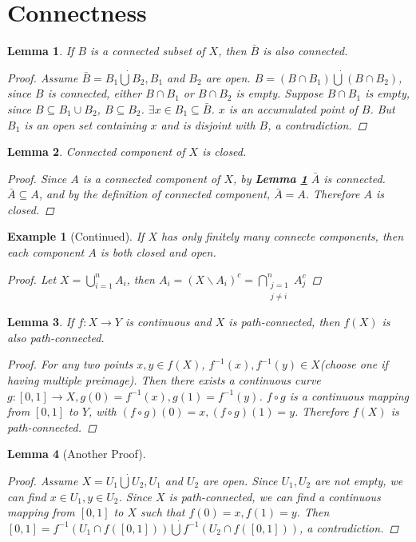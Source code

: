 \documentclass{article}
\newtheorem{example}{Example}[section] %
\newtheorem{lemma}{Lemma}[section]
\begin{document}
\section{Connectness}
\setcounter{lemma}{18}
\begin{lemma}\label{closedC}
If $B$ is a connected subset of $X$, then $\bar{B}$ is also connected.
\begin{proof}
Assume $\bar{B} = B_1 \dot\bigcup B_2,B_1$ and $B_2$ are open. $B = (B\cap B_1)\dot\bigcup (B\cap B_2)$, since $B$ is connected, either $B\cap B_1$ or
$B\cap B_2$ is empty. Suppose $B\cap B_1$ is empty, since $B\subseteq B_1\cup B_2$, $B\subseteq B_2$. $\exists x\in B_1\subseteq \bar{B}$. $x$ is an       
accumulated point of $B$. But $B_1$ is an open set containing $x$ and is disjoint with $B$, a contradiction.

\end{proof}
\end{lemma}
\setcounter{lemma}{21}
\begin{lemma}
Connected component of $X$ is closed.
\begin{proof}
Since $A$ is a connected component of $X$, by \textbf{Lemma \ref{closedC}} $\bar{A}$ is connected. $\bar{A}\subseteq A$, and by the definition of connected component, $\bar{A}=A$. Therefore $A$ is closed.
\end{proof}
\end{lemma}
\setcounter{example}{22}
\begin{example}[Continued]
If $X$ has only finitely many connecte components, then each component $A$ is both closed and open.
\begin{proof}
Let $X=\displaystyle\bigcup_{i=1}^n A_i$, then $A_i=(X\backslash A_i)^c = \displaystyle\bigcap_{\substack{j=1\\j\neq i}}^{n} A_j^c $
\end{proof}
\end{example}
\setcounter{lemma}{24}
\begin{lemma}
If $f: X \to Y$ is continuous and $X$ is path-connected, then $f(X)$ is also path-connected.
\begin{proof}
For any two points $x,y\in f(X)$, $f^{-1}(x),f^{-1}(y)\in X$(choose one if having multiple preimage). Then there exists a continuous curve $g:[0,1]\to X,g(0)=f^{-1}(x),g(1)=f^{-1}(y)$. $f\circ g$ is a continuous mapping from $[0,1]$ to $Y$, with $(f\circ g)(0)= x, (f\circ g)(1)=y$. Therefore $f(X)$ is path-connected.
\end{proof}
\end{lemma}
\begin{lemma}[Another Proof]
\begin{proof}
Assume $X=U_1 \dot\bigcup U_2,U_1$ and $U_2$ are open. Since $U_1,U_2$ are not empty, we can find $x\in U_1,y \in U_2$. 
Since $X$ is path-connected, we can find a continuous mapping from $[0,1]$ to $X$ such that $f(0)=x,f(1)=y$. Then
$[0,1]=f^{-1}(U_1 \cap f([0,1])) \dot\bigcup f^{-1}(U_2 \cap f([0,1])) $, a contradiction.
\end{proof}
\end{lemma}
\end{document}
